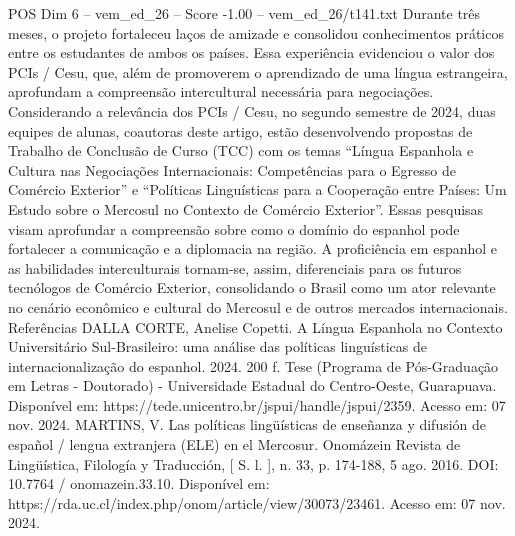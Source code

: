 \begin{textsample}{POS Dim 6 – vem\_ed\_26 – Score -1.00 – vem\_ed\_26/t141.txt}
Durante três meses, o projeto fortaleceu laços de amizade e consolidou conhecimentos práticos entre os estudantes de ambos os países.
Essa experiência evidenciou o valor dos PCIs / Cesu, que, além de promoverem o aprendizado de uma língua estrangeira, aprofundam a compreensão intercultural necessária para negociações.
Considerando a relevância dos PCIs / Cesu, no segundo semestre de 2024, duas equipes de alunas, coautoras deste artigo, estão desenvolvendo propostas de Trabalho de Conclusão de Curso (TCC) com os temas “Língua Espanhola e Cultura nas Negociações Internacionais: Competências para o Egresso de Comércio Exterior” e “Políticas Linguísticas para a Cooperação entre Países: Um Estudo sobre o Mercosul no Contexto de Comércio Exterior”.
Essas pesquisas visam aprofundar a compreensão sobre como o domínio do espanhol pode fortalecer a comunicação e a diplomacia na região.
A proficiência em espanhol e as habilidades interculturais tornam-se, assim, diferenciais para os futuros tecnólogos de Comércio Exterior, consolidando o Brasil como um ator relevante no cenário econômico e cultural do Mercosul e de outros mercados internacionais.
Referências DALLA CORTE, Anelise Copetti.
A Língua Espanhola no Contexto Universitário Sul-Brasileiro: uma análise das políticas linguísticas de internacionalização do espanhol. 2024. 200 f.
Tese (Programa de Pós-Graduação em Letras - Doutorado) - Universidade Estadual do Centro-Oeste, Guarapuava.
Disponível em: https://tede.unicentro.br/jspui/handle/jspui/2359.
Acesso em: 07 nov. 2024.
MARTINS, V.
Las políticas lingüísticas de enseñanza y difusión de español / lengua extranjera (ELE) en el Mercosur.
Onomázein Revista de Lingüística, Filología y Traducción, [ S. l. ], n. 33, p. 174-188, 5 ago. 2016.
DOI: 10.7764 / onomazein.33.10.
Disponível em: https://rda.uc.cl/index.php/onom/article/view/30073/23461.
Acesso em: 07 nov. 2024.

\end{textsample}
